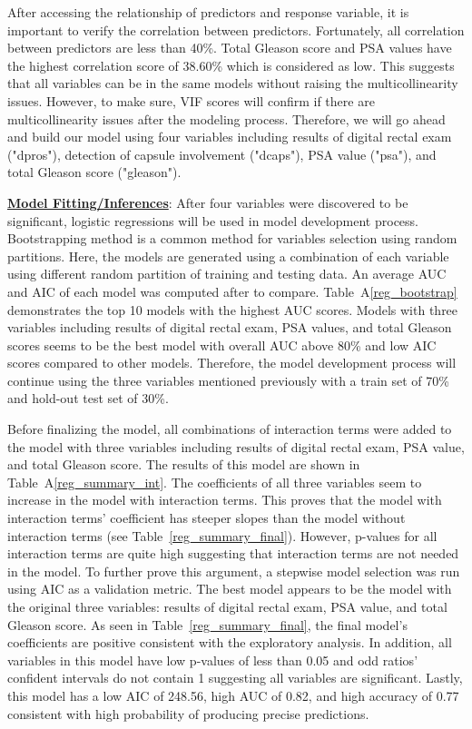 \documentclass[11pt]{article}\usepackage[]{graphicx}\usepackage[]{color}
\begin{document}
\noindent After accessing the relationship of predictors and response variable, it is important to verify the correlation between predictors. Fortunately, all correlation between predictors are less than 40\%. Total Gleason score and PSA values have the highest correlation score of 38.60\% which is considered as low. This suggests that all variables can be in the same models without raising the multicollinearity issues. However, to make sure, VIF scores will confirm if there are multicollinearity issues after the modeling process. Therefore, we will go ahead and build our model using four variables including results of digital rectal exam ("dpros"), detection of capsule involvement ("dcaps"), PSA value ("psa"), and total Gleason score ("gleason").
\hfill \break

\noindent\textbf{\underline{Model Fitting/Inferences}}: After four variables were discovered to be significant, logistic regressions will be used in model development process. Bootstrapping method is a common method for variables selection using random partitions. Here, the models are generated using a combination of each variable using different random partition of training and testing data. An average AUC and AIC of each model was computed after to compare. Table~A\ref{reg_bootstrap} demonstrates the top 10 models with the highest AUC scores. Models with three variables including results of digital rectal exam, PSA values, and total Gleason scores seems to be the best model with overall AUC above 80\% and low AIC scores compared to other models. Therefore, the model development process will continue using the three variables mentioned previously with a train set of 70\% and hold-out test set of 30\%.
\hfill \break

\noindent Before finalizing the model, all combinations of interaction terms were added to the model with three variables including results of digital rectal exam, PSA value, and total Gleason score. The results of this model are shown in Table~A\ref{reg_summary_int}. The coefficients of all three variables seem to increase in the model with interaction terms. This proves that the model with interaction terms’ coefficient has steeper slopes than the model without interaction terms (see Table~\ref{reg_summary_final}). However, p-values for all interaction terms are quite high suggesting that interaction terms are not needed in the model. To further prove this argument, a stepwise model selection was run using AIC as a validation metric. The best model appears to be the model with the original three variables: results of digital rectal exam, PSA value, and total Gleason score. As seen in Table~\ref{reg_summary_final}, the final model's coefficients are positive consistent with the exploratory analysis. In addition, all variables in this model have low p-values of less than 0.05 and odd ratios’ confident intervals do not contain 1 suggesting all variables are significant. Lastly, this model has a low AIC of 248.56, high AUC of 0.82, and high accuracy of 0.77 consistent with high probability of producing precise predictions.
\noindent 
\end{document}
